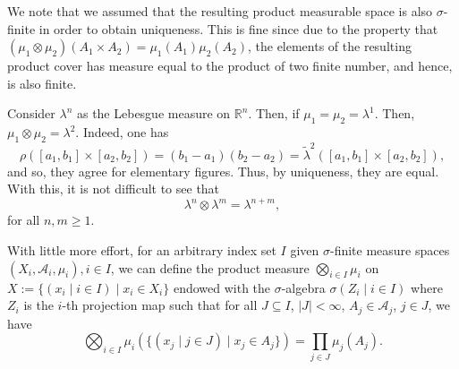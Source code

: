 \documentclass[
]{article}
\theoremstyle{definition}
\theoremstyle{definition}
\begin{document}
We note that we assumed that the resulting product measurable space is
also \(\sigma\)-finite in order to obtain uniqueness. This is fine since
due to the property that
\((\mu_1 \otimes \mu_2)(A_1 \times A_2) = \mu_1(A_1) \mu_2(A_2)\), the
elements of the resulting product cover has measure equal to the product
of two finite number, and hence, is also finite.

Consider \(\lambda^n\) as the Lebesgue measure on \(\mathbb{R}^n\).
Then, if \(\mu_1 = \mu_2 = \lambda^1\). Then,
\(\mu_1 \otimes \mu_2 = \lambda^2\). Indeed, one has
\[\rho([a_1, b_1] \times [a_2, b_2]) = (b_1 - a_1)(b_2 - a_2) 
  = \tilde \lambda^2([a_1, b_1] \times [a_2, b_2]),\] and so, they agree
for elementary figures. Thus, by uniqueness, they are equal. With this,
it is not difficult to see that
\[\lambda^n \otimes \lambda^m = \lambda^{n + m},\] for all
\(n, m \ge 1\).

With little more effort, for an arbitrary index set \(I\) given
\(\sigma\)-finite measure spaces
\((X_i, \mathcal{A}_i, \mu_i), i \in I\), we can define the product
measure \(\bigotimes_{i \in I} \mu_i\) on
\(X := \{(x_i \mid i \in I) \mid x_i \in X_i\}\) endowed with the
\(\sigma\)-algebra \(\sigma(Z_i \mid i \in I)\) where \(Z_i\) is the
\(i\)-th projection map such that for all \(J \subseteq I\),
\(|J| < \infty\), \(A_j \in \mathcal{A}_j\), \(j \in J\), we have
\[\bigotimes_{i \in I}\mu_i(\{(x_j \mid j \in J) \mid x_j \in A_j\}) 
  = \prod_{j \in J} \mu_j(A_j).\]
\end{document}
